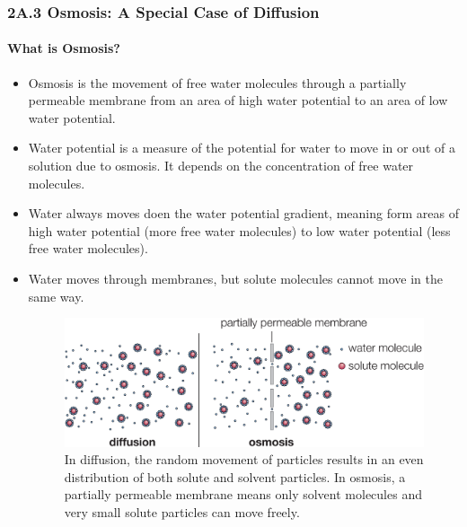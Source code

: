 
\subsubsection{2A.3 Osmosis: A Special Case of Diffusion}
\paragraph{What is Osmosis?}
\begin{itemize}
    \item Osmosis is the movement of free water molecules through a partially permeable membrane from an area of high water
    potential to an area of low water potential.
    \item Water potential is a measure of the potential for water to move in or out of a solution due to osmosis. It depends on
    the concentration of free water molecules.
    \item Water always moves doen the water potential gradient, meaning form areas of high water potential (more free water
    molecules) to low water potential (less free water molecules).
    \item Water moves through membranes, but solute molecules cannot move in the same way.
    \begin{figure}[H]
        \centering
        \includegraphics[scale=0.12]{Biology/2A/Images/2A-3-1.png}
        \caption{In diffusion, the random movement of particles results in an even distribution of both solute and solvent
        particles. In osmosis, a partially permeable membrane means only solvent molecules and very small solute particles can
        move freely.}
    \end{figure}
\end{itemize}

